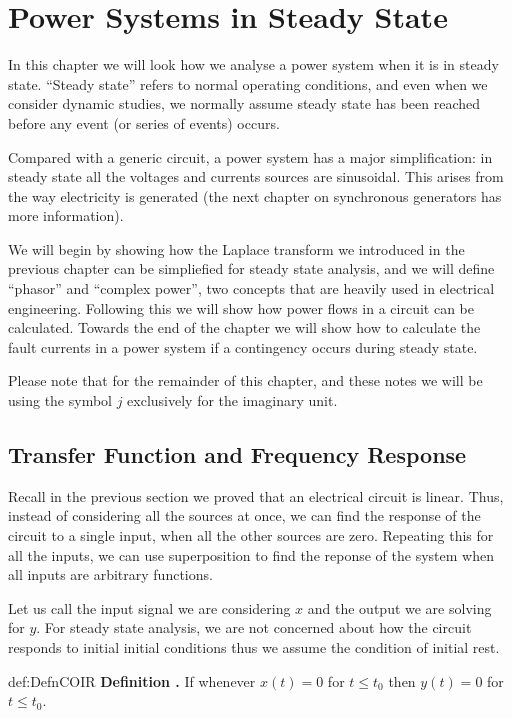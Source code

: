 \documentclass[14pt,a5paper,twoside]{book}
\newenvironment{myDefinition}[2]{ \begin{Definition}[adjusted title=#1]{}{#2} 
  \textbf{Definition \thetcbcounter.} \label{#2}}{\end{Definition}}
\begin{document}
\chapter{Power Systems in Steady State}
In this chapter we will look how we analyse a power system when it is in steady state. ``Steady state'' refers to normal operating conditions, and even when we consider dynamic studies, we normally assume steady state has been reached before any event (or series of events) occurs.

Compared with a generic circuit, a power system has a major simplification: in steady state all the voltages and currents sources are sinusoidal. This arises from the way electricity is generated (the next chapter on synchronous generators has more information).

We will begin by showing how the Laplace transform we introduced in the previous chapter can be simpliefied for steady state analysis, and we will define ``phasor'' and ``complex power'', two concepts that are heavily used in electrical engineering. Following this we will show how power flows in a circuit can be calculated. Towards the end of the chapter we will show how to calculate the fault currents in a power system if a contingency occurs during steady state.

Please note that for the remainder of this chapter, and these notes we will be using the symbol $j$ exclusively for the imaginary unit.

\section{Transfer Function and Frequency Response}
Recall in the previous section we proved that an electrical circuit is linear. Thus, instead of considering all the sources at once, we can find the response of the circuit to a single input, when all the other sources are zero. Repeating this for all the inputs, we can use superposition to find the reponse of the system when all inputs are arbitrary functions. 

Let us call the input signal we are considering $x$ and the output we are solving for $y$. For steady state analysis, we are not concerned about how the circuit responds to initial initial conditions thus we assume the condition of initial rest.

\begin{myDefinition}{Condition of Initial Rest}{def:DefnCOIR}
If whenever $x(t) = 0$ for $t\leq t_0$ then $y(t)=0$ for $t\leq t_0$.
\end{myDefinition}
\end{document}
